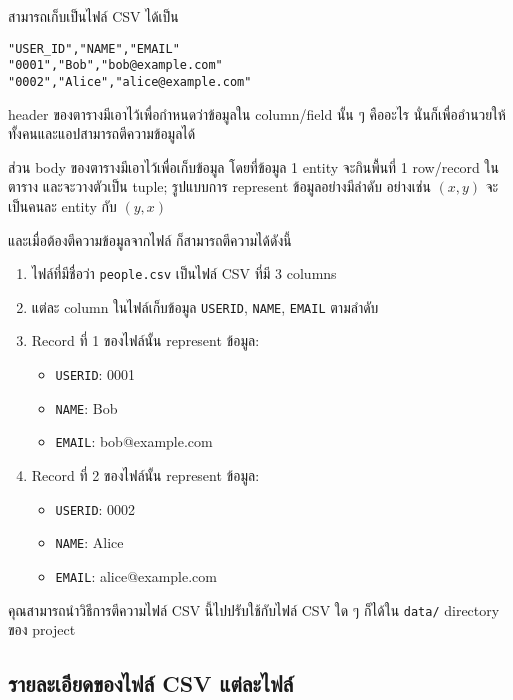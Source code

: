 สามารถเก็บเป็นไฟล์ CSV ได้เป็น

\begin{lstlisting}[caption={\texttt{people.csv}},label={lst:people.csv},numbers=none]
"USER_ID","NAME","EMAIL"
"0001","Bob","bob@example.com"
"0002","Alice","alice@example.com"
\end{lstlisting}

header ของตารางมีเอาไว้เพื่อกำหนดว่าข้อมูลใน column/field นั้น ๆ คืออะไร
นั่นก็เพื่ออำนวยให้ทั้งคนและแอปสามารถตีความข้อมูลได้

ส่วน body ของตารางมีเอาไว้เพื่อเก็บข้อมูล โดยที่ข้อมูล 1 entity จะกินพื้นที่ 1 row/record ในตาราง
และจะวางตัวเป็น tuple; รูปแบบการ represent ข้อมูลอย่างมีลำดับ อย่างเช่น $ (x, y) $ จะเป็นคนละ entity กับ $ (y, x) $

และเมื่อต้องตีความข้อมูลจากไฟล์  ก็สามารถตีความได้ดังนี้

\begin{enumerate}
    \item ไฟล์ที่มีชื่อว่า \texttt{people.csv} เป็นไฟล์ CSV ที่มี 3 columns
    \item แต่ละ column ในไฟล์เก็บข้อมูล \texttt{USER\textunderscore{}ID}, \texttt{NAME}, \texttt{EMAIL} ตามลำดับ
    \item Record ที่ 1 ของไฟล์นั้น represent ข้อมูล:
        \begin{itemize}
            \item \texttt{USER\textunderscore{}ID}: 0001
            \item \texttt{NAME}: Bob
            \item \texttt{EMAIL}: bob@example.com
        \end{itemize}
    \item Record ที่ 2 ของไฟล์นั้น represent ข้อมูล:
        \begin{itemize}
            \item \texttt{USER\textunderscore{}ID}: 0002
            \item \texttt{NAME}: Alice
            \item \texttt{EMAIL}: alice@example.com
        \end{itemize}
\end{enumerate}

คุณสามารถนำวิธีการตีความไฟล์ CSV นี้ไปปรับใช้กับไฟล์ CSV ใด ๆ ก็ได้ใน \texttt{data/} directory ของ project

\subsection{รายละเอียดของไฟล์ CSV แต่ละไฟล์}
\noindent\blindtext[3]
